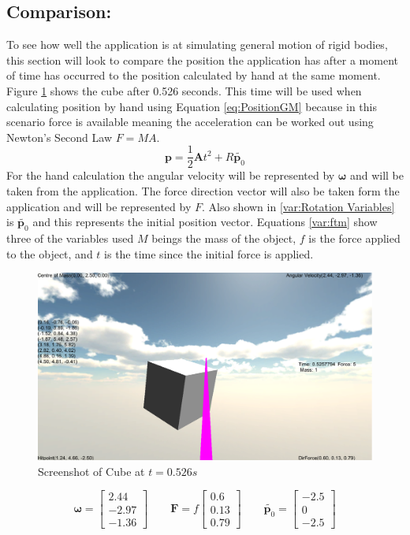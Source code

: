 \subsection{Comparison:}
To see how well the application is at simulating general motion of rigid bodies, this section will look to compare the position the application has after a moment of time has occurred to the position calculated by hand at the same moment.
Figure \ref{fig:ScreenShotSingle} shows the cube after 0.526 seconds.
This time will be used when calculating position by hand using Equation \ref{eq:PositionGM} because in this scenario force is available meaning the acceleration can be worked out using Newton's Second Law $F=MA$.
\begin{equation}\label{eq:PositionGM}
\mathbf{p}=\frac{1}{2}\mathbf{A}t^{2}+{R}\tilde{\mathbf{p}_{0}}
\end{equation}
For the hand calculation the angular velocity will be represented by $\boldsymbol{\omega}$ and will be taken from the application.
The force direction vector will also be taken form the application and will be represented by $F$.
Also shown in \ref{var:Rotation Variables} is $\tilde{\mathbf{p}_{0}}$ and this represents the initial position vector.
Equations \ref{var:ftm} show three of the variables used $M$ beings the mass of the object, $f$ is the force applied to the object, and $t$ is the time since the initial force is applied. 
\begin{figure}[h!]
	\centering
	\includegraphics[width=\textwidth]{images/Screenshot2.PNG}
	\caption{Screenshot of Cube at $t = 0.526 s$}
	\label{fig:ScreenShotSingle}
\end{figure}
\begin{equation}\label{var:Rotation Variables}
	\boldsymbol{\omega} = 
	\begin{bmatrix}
		 2.44 \\
		-2.97 \\
		-1.36 
	\end{bmatrix}
	\qquad
	\mathbf{F} = f
	\begin{bmatrix}
		 0.6  \\
		 0.13 \\
		 0.79 
	\end{bmatrix}
	\qquad
	\tilde{\mathbf{p}_{0}} = 
	\begin{bmatrix}
		-2.5 \\
		 0 	 \\
		-2.5 
	\end{bmatrix}
\end{equation}
